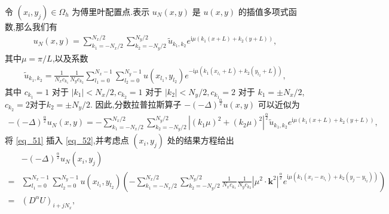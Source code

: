 令 $\left(x_{i}, y_{j}\right) \in \Omega_{h}$ 为傅里叶配置点.表示 $u_{N}(x, y)$ 是
$u(x, y)$ 的插值多项​​式函数,那么我们有
\begin{align}\label{eq_50}
u_{N}(x, y)=\sum_{k_{1}=-N_{x} / 2}^{N_{x} / 2} \sum_{k_{2}=-N_{y} / 2}^{N_{y} / 2} \tilde{u}_{k_{1}, k_{2}} e^{\mathrm{i}\mu\left( k_{1} (x+L)+k_{2}(y+L)\right)},
\end{align}
其中$\mu={\pi}/{L}$,以及系数
\begin{align}\label{eq_51}
\tilde{u}_{k_{1}, k_{2}}=\frac{1}{N_{x} c_{k_{1}}} \frac{1}{N_{y} c_{k_{2}}} \sum_{l_1=0}^{N_{x}-1} \sum_{l_2=0}^{N_{y}-1} u(x_{l_1}, y_{l_2}) e^{-\mathrm{i}\mu\left( k_{1}(x_{l_1}+L)+k_{2}(y_{l_2}+L)\right)},
\end{align}
其中 $c_{k_{1}}=1$ 对于 $\left|k_{1}\right|<N_{x} / 2, c_{k_{2}}=1$ 对于 $\left|k_{2 }\right|<N_{y} / 2, c_{k_{1}}=2$ 对于 $k_{1}=\pm N_{x} / 2$, $c_{k_{2}}=2$对于$ k_{2}=\pm N_{y} / 2$.
因此,分数拉普拉斯算子 $-(-\Delta)^{\frac{\alpha}{2}} u(x, y)$ 可以近似为
\begin{align}\label{eq_52}
-(-\Delta)^{\frac{\alpha}{2}} u_{N}\left(x, y\right)=-\sum\limits_{k_{1}=-N_{x} / 2}^{N_{x} / 2} \sum\limits_{k_{2}=-N_{y} / 2}^{N_{y} / 2}\left|\left(k_{1} \mu\right)^{2}+\left(k_{2} \mu\right)^{2}\right|^{\frac{\alpha}{2}} \tilde{u}_{k_{1}, k_{2}} e^{\mathrm{i}\mu\left( k_{1} (x+L)+k_{2}(y+L)\right)},
\end{align}
将 \eqref{eq_51} 插入 \eqref{eq_52},并考虑点 $(x_i,y_j)$ 处的结果方程给出
\begin{align}
&-(-\Delta)^{\frac{\alpha}{2}} u_{N}\left(x_{i}, y_{j}\right)\nonumber\\
=&\sum\limits_{l_{1}=0}^{N_{x}-1} \sum\limits_{l_{2}=0}^{N_{y}-1}u(x_{l_{1}}, y_{l_{2}})\left(-\sum\limits_{k_{1}=-N_{x} / 2}^{N_{x} / 2} \sum\limits_{k_{2}=-N_{y} / 2}^{N_{y} / 2} \frac{1}{N_{x} c_{k_{1}}} \frac{1}{N_{y} c_{k_{2}}}\left|\mu^{2} \cdot \mathbf{k}^{2}\right|^{\frac{\alpha}{2}} e^{\mathrm{i} \mu\left(k_{1}\left(x_{i}-x_{l_{1}}\right)+k_{2}\left(y_{j}-y_{l_{2}}\right)\right)}\right)\nonumber\\
=&\left(D^{\alpha}U\right)_{i+j N_{x}},\label{eq_53}
\end{align}
